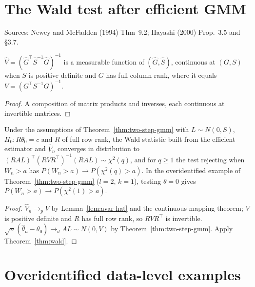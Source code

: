 \section{The Wald test after efficient GMM}
\label{sec:gmm-wald}

Sources: Newey and McFadden (1994) Thm~9.2; Hayashi (2000) Prop.~3.5 and \S3.7.

\begin{lemma}
\label{lem:avar-hat}
\leanok
{}
$\hat V = (\hat G^\top\hat S^{-1}\hat G)^{-1}$ is a measurable function of $(\hat G,\hat S)$, continuous at $(G,S)$ when
$S$ is positive definite and $G$ has full column rank, where it equals $V = (G^\top S^{-1}G)^{-1}$.
\end{lemma}
\begin{proof}
\leanok
A composition of matrix products and inverses, each continuous at invertible matrices.
\end{proof}

\begin{theorem}
\label{thm:gmm-wald}
\leanok
{}
Under the assumptions of Theorem~\ref{thm:two-step-gmm} with $L\sim N(0,S)$, $H_0: R\theta_0 = c$ and $R$ of full row
rank, the Wald statistic built from the efficient estimator and $\hat V_n$ converges in distribution to
$(RAL)^\top(RVR^\top)^{-1}(RAL)\sim\chi^2(q)$, and for $q\ge1$ the test rejecting when $W_n > a$ has
$P(W_n > a)\to P(\chi^2(q) > a)$. In the overidentified example of Theorem~\ref{thm:two-step-gmm} ($l = 2$, $k = 1$),
testing $\theta = 0$ gives $P(W_n > a)\to P(\chi^2(1) > a)$.
\end{theorem}
\begin{proof}
\leanok
$\hat V_n\to_p V$ by Lemma~\ref{lem:avar-hat} and the continuous mapping theorem; $V$ is positive definite and $R$ has
full row rank, so $RVR^\top$ is invertible. $\sqrt n(\hat\theta_n-\theta_0)\to_d AL\sim N(0,V)$ by
Theorem~\ref{thm:two-step-gmm}. Apply Theorem~\ref{thm:wald}.
\end{proof}

\section{Overidentified data-level examples}
\label{sec:chi-squared-witnesses}

